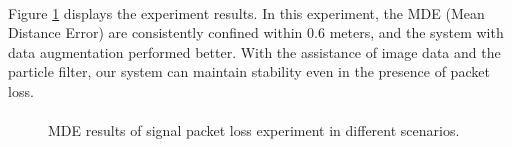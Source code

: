 \documentclass[a4paper,12pt]{report}
\begin{document}
\paragraph{}
Figure \ref{Fig:fake_w} displays the experiment results. In this experiment, the MDE (Mean Distance Error) are consistently confined within $0.6$ meters, and the system with data augmentation performed better. With the assistance of image data and the particle filter, our system can maintain stability even in the presence of packet loss. 
\paragraph{}
\begin{figure}[htbp]
    \centering
    
    \caption{MDE results of signal packet loss experiment in different scenarios.}
    \label{Fig:fake_w}
\end{figure}
\end{document}
